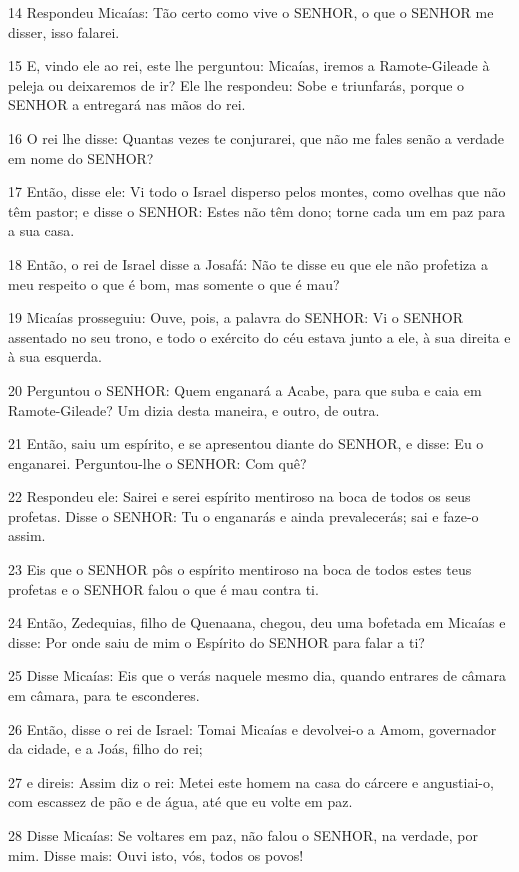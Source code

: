 \par 14 Respondeu Micaías: Tão certo como vive o SENHOR, o que o SENHOR me disser, isso falarei.
\par 15 E, vindo ele ao rei, este lhe perguntou: Micaías, iremos a Ramote-Gileade à peleja ou deixaremos de ir? Ele lhe respondeu: Sobe e triunfarás, porque o SENHOR a entregará nas mãos do rei.
\par 16 O rei lhe disse: Quantas vezes te conjurarei, que não me fales senão a verdade em nome do SENHOR?
\par 17 Então, disse ele: Vi todo o Israel disperso pelos montes, como ovelhas que não têm pastor; e disse o SENHOR: Estes não têm dono; torne cada um em paz para a sua casa.
\par 18 Então, o rei de Israel disse a Josafá: Não te disse eu que ele não profetiza a meu respeito o que é bom, mas somente o que é mau?
\par 19 Micaías prosseguiu: Ouve, pois, a palavra do SENHOR: Vi o SENHOR assentado no seu trono, e todo o exército do céu estava junto a ele, à sua direita e à sua esquerda.
\par 20 Perguntou o SENHOR: Quem enganará a Acabe, para que suba e caia em Ramote-Gileade? Um dizia desta maneira, e outro, de outra.
\par 21 Então, saiu um espírito, e se apresentou diante do SENHOR, e disse: Eu o enganarei. Perguntou-lhe o SENHOR: Com quê?
\par 22 Respondeu ele: Sairei e serei espírito mentiroso na boca de todos os seus profetas. Disse o SENHOR: Tu o enganarás e ainda prevalecerás; sai e faze-o assim.
\par 23 Eis que o SENHOR pôs o espírito mentiroso na boca de todos estes teus profetas e o SENHOR falou o que é mau contra ti.
\par 24 Então, Zedequias, filho de Quenaana, chegou, deu uma bofetada em Micaías e disse: Por onde saiu de mim o Espírito do SENHOR para falar a ti?
\par 25 Disse Micaías: Eis que o verás naquele mesmo dia, quando entrares de câmara em câmara, para te esconderes.
\par 26 Então, disse o rei de Israel: Tomai Micaías e devolvei-o a Amom, governador da cidade, e a Joás, filho do rei;
\par 27 e direis: Assim diz o rei: Metei este homem na casa do cárcere e angustiai-o, com escassez de pão e de água, até que eu volte em paz.
\par 28 Disse Micaías: Se voltares em paz, não falou o SENHOR, na verdade, por mim. Disse mais: Ouvi isto, vós, todos os povos!
